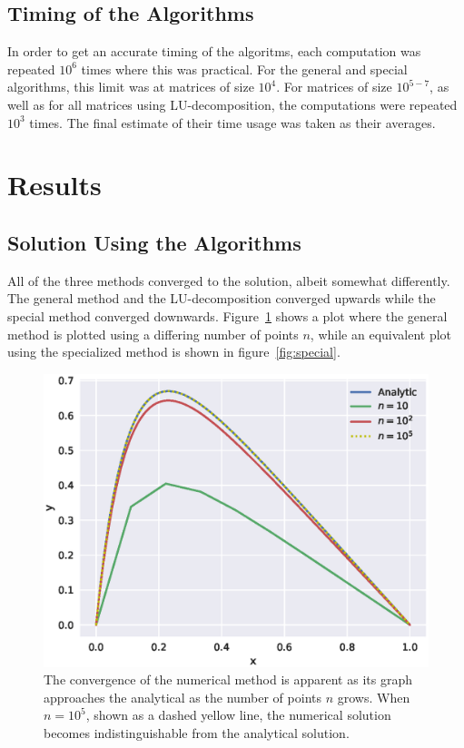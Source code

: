 \documentclass[aps,reprint]{revtex4-1}
\begin{document}
\subsection{Timing of the Algorithms}
\label{sec:timingmethod}
In order to get an accurate timing of the algoritms, each computation was
repeated \(10^6\) times where this was practical. For the general and special
algorithms, this limit was at matrices of size \(10^4\). For matrices of size
\(10^{5-7}\), as well as for all matrices using LU-decomposition, the
computations were repeated \(10^{3}\) times. The final estimate of their time
usage was taken as their averages.

\section{Results}
\subsection{Solution Using the Algorithms}

All of the three methods converged to the solution, albeit somewhat differently.
The general method and the LU-decomposition converged upwards while the
special method converged downwards. Figure~\ref{fig:general} shows a plot where
the general method is plotted using a differing number of points \(n\), while
an equivalent plot using the specialized method is shown in figure~\ref{fig:special}.

\begin{figure}[ht]
  \centering
  \includegraphics[width=\columnwidth]{figures/general.eps}
  \caption{\label{fig:general} The convergence of the numerical method is
    apparent as its graph approaches the analytical as the number of points \(n\) grows. When \(n
    = 10^{5}\), shown as a dashed yellow line, the numerical solution becomes
    indistinguishable from the analytical solution.}
\end{figure}
\end{document}
